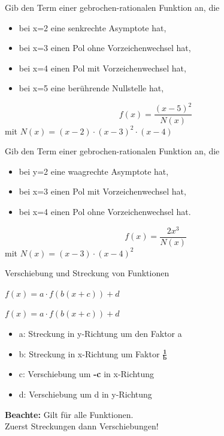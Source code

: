\begin{frage}\LARGE Gib den Term einer gebrochen-rationalen Funktion an, die
	\begin{itemize} \large
		\item bei x=2 eine senkrechte Asymptote hat,		
		\item bei x=3 einen Pol ohne Vorzeichenwechsel hat, 
		\item bei x=4 einen Pol mit Vorzeichenwechsel hat,
		\item bei x=5 eine berührende Nullstelle hat,			
	\end{itemize}\end{frage}
\begin{antwort}\LARGE 
	\[ f(x)=\frac{ (x-5)^2 }{N(x)} \]
	\normalsize mit $N(x)=(x-2) \cdot (x-3)^2 \cdot (x-4)$\end{antwort}
\begin{frage}\LARGE Gib den Term einer gebrochen-rationalen Funktion an, die
	\begin{itemize} \large
		\item bei y=2 eine waagrechte Asymptote hat,		
		\item bei x=3 einen Pol mit Vorzeichenwechsel hat, 
		\item bei x=4 einen Pol ohne Vorzeichenwechsel hat.	
		
	\end{itemize}\end{frage}
\begin{antwort}\LARGE 
	\[ f(x)=\frac{ 2x^3}{N(x)} \]
	\normalsize mit $N(x)=(x-3) \cdot (x-4)^2$\end{antwort}
\begin{frage}Verschiebung und Streckung von Funktionen  \bigskip
	
	$f(x)=a \cdot f(b(x+c))+d$\end{frage}
\begin{antwort}\large
	$f(x)=a \cdot f(b(x+c))+d$
	\begin{itemize}

		\item a: Streckung in y-Richtung um den Faktor a
		\item b: Streckung in x-Richtung um Faktor $\mathbf{\frac{1}{b}}$
		\item c: Verschiebung um \textbf{-c} in x-Richtung
		\item d: Verschiebung um d in y-Richtung
							
	\end{itemize}
	\textbf{Beachte:} Gilt für alle Funktionen.\\
	 Zuerst Streckungen dann Verschiebungen!\end{antwort}
